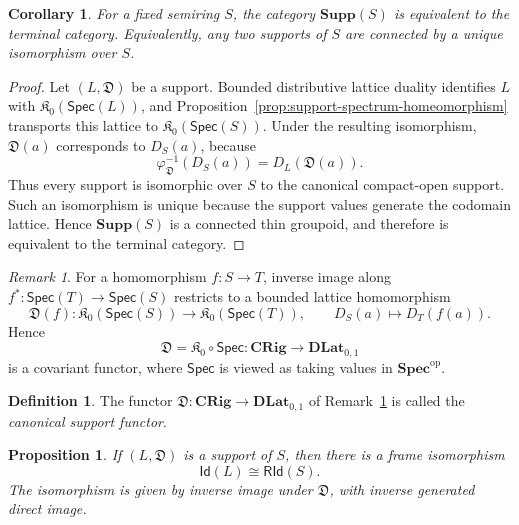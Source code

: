 \documentclass[12pt,leqno]{amsart}
\newcommand{\CRig}{\mathbf{CRig}}
\newcommand{\SpecSp}{\mathbf{Spec}}
\newcommand{\DLat}{\mathbf{DLat}_{0,1}}
\newcommand{\Supp}{\mathbf{Supp}}
\newcommand{\Spec}{\mathsf{Spec}}
\newcommand{\RId}{\mathsf{RId}}
\newcommand{\Id}{\mathsf{Id}}
\newcommand{\KOpen}{\mathfrak K_{0}}
\newcommand{\op}{\mathrm{op}}
\newtheorem{proposition}[theorem]{Proposition}
\newtheorem{corollary}[theorem]{Corollary}
\theoremstyle{definition}
\newtheorem{definition}{Definition}[section]
\numberwithin{equation}{section}
\theoremstyle{remark}
\newtheorem{remark}[theorem]{Remark}
\begin{document}
\begin{corollary}\label{cor:support-category-contractible}
For a fixed semiring $S$, the category \(\Supp(S)\) is equivalent to the terminal category. Equivalently, any two supports of $S$ are connected by a unique isomorphism over $S$.
\end{corollary}

\begin{proof}
Let \((L,\mathfrak D)\) be a support. Bounded distributive lattice duality identifies $L$ with \(\KOpen(\Spec(L))\), and Proposition~\ref{prop:support-spectrum-homeomorphism} transports this lattice to \(\KOpen(\Spec(S))\). Under the resulting isomorphism,
\(\mathfrak D(a)\) corresponds to \(D_S(a)\), because
\[
\varphi_{\mathfrak D}^{-1}(D_S(a))=D_L(\mathfrak D(a)).
\]
Thus every support is isomorphic over $S$ to the canonical compact-open support. Such an isomorphism is unique because the support values generate the codomain lattice. Hence \(\Supp(S)\) is a connected thin groupoid, and therefore is equivalent to the terminal category.
\end{proof}

\begin{remark}\label{rem:canonical-support-functor}
For a homomorphism \(f\colon S\to T\), inverse image along
\(f^*\colon\Spec(T)\to\Spec(S)\) restricts to a bounded lattice homomorphism
\[
\mathfrak D(f)\colon\KOpen(\Spec(S))\longrightarrow\KOpen(\Spec(T)),
\qquad
D_S(a)\longmapsto D_T(f(a)).
\]
Hence
\[
\mathfrak D=\KOpen\circ\Spec\colon\CRig\longrightarrow\DLat
\]
is a covariant functor, where \(\Spec\) is viewed as taking values in \(\SpecSp^{\op}\).
\end{remark}

\begin{definition}\label{def:canonical-support-functor}
The functor \(\mathfrak D\colon\CRig\to\DLat\) of Remark~\ref{rem:canonical-support-functor} is called the \emph{canonical support functor}.
\end{definition}

\begin{proposition}\label{prop:support-frame-reconstruction}
If \((L,\mathfrak D)\) is a support of $S$, then there is a frame isomorphism
\[
\Id(L)\cong\RId(S).
\]
The isomorphism is given by inverse image under \(\mathfrak D\), with inverse generated direct image.
\end{proposition}
\end{document}
